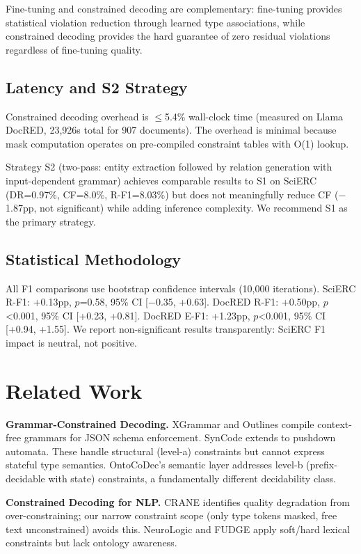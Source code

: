\documentclass[11pt]{article}
\begin{document}
Fine-tuning and constrained decoding are complementary: fine-tuning provides statistical violation reduction through learned type associations, while constrained decoding provides the hard guarantee of zero residual violations regardless of fine-tuning quality.

\subsection{Latency and S2 Strategy}

Constrained decoding overhead is $\leq$5.4\% wall-clock time (measured on Llama DocRED, 23,926s total for 907 documents). The overhead is minimal because mask computation operates on pre-compiled constraint tables with O(1) lookup.

Strategy S2 (two-pass: entity extraction followed by relation generation with input-dependent grammar) achieves comparable results to S1 on SciERC (DR=0.97\%, CF=8.0\%, R-F1=8.03\%) but does not meaningfully reduce CF ($-$1.87pp, not significant) while adding inference complexity. We recommend S1 as the primary strategy.

\subsection{Statistical Methodology}

All F1 comparisons use bootstrap confidence intervals (10,000 iterations). SciERC R-F1: +0.13pp, $p$=0.58, 95\% CI [$-$0.35, +0.63]. DocRED R-F1: +0.50pp, $p$<0.001, 95\% CI [+0.23, +0.81]. DocRED E-F1: +1.23pp, $p$<0.001, 95\% CI [+0.94, +1.55]. We report non-significant results transparently: SciERC F1 impact is neutral, not positive.

\section{Related Work}

\textbf{Grammar-Constrained Decoding.} XGrammar and Outlines compile context-free grammars for JSON schema enforcement. SynCode extends to pushdown automata. These handle structural (level-a) constraints but cannot express stateful type semantics. OntoCoDec's semantic layer addresses level-b (prefix-decidable with state) constraints, a fundamentally different decidability class.

\textbf{Constrained Decoding for NLP.} CRANE identifies quality degradation from over-constraining; our narrow constraint scope (only type tokens masked, free text unconstrained) avoids this. NeuroLogic and FUDGE apply soft/hard lexical constraints but lack ontology awareness.
\end{document}
